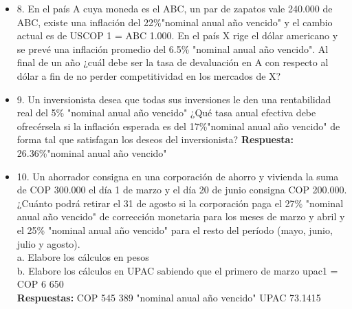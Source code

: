 \begin{itemize}
 \item 8. En el país A cuya moneda es el ABC, un par de zapatos vale 240.000 de ABC, existe una inflación  del 22\%"nominal anual año vencido" y el cambio actual es de USCOP 1 = ABC 1.000. En el país X rige el dólar americano y se prevé  una inflación promedio del 6.5\% "nominal anual año vencido". Al final de un año ¿cuál debe ser la tasa de devaluación en A con respecto al dólar a fin de no perder competitividad en los mercados de X?\\
       \medskip

 \item 9. Un inversionista desea que todas sus inversiones le den una rentabilidad real del 5\% "nominal anual año vencido" ¿Qué  tasa anual efectiva debe ofrecérsela si la inflación esperada es del 17\%"nominal anual año vencido" de forma tal que satisfagan  los deseos del inversionista?
       \textbf{Respuesta:} 26.36\%"nominal anual año vencido"\\
       \medskip

 \item 10. Un ahorrador consigna en una corporación de ahorro y vivienda la suma de COP 300.000 el día 1 de  marzo y el día 20 de junio consigna COP 200.000.  ¿Cuánto  podrá  retirar  el  31  de  agosto  si la corporación  paga el  27\% "nominal anual año vencido" de corrección monetaria para los meses de marzo y abril y el 25\% "nominal anual año vencido"  para el resto del período (mayo, junio, julio y agosto).\\
       a. Elabore los cálculos en pesos\\
       b. Elabore los cálculos en UPAC sabiendo que el primero de marzo upac1 = COP 6 650\\
       \textbf{Respuestas:} COP 545 389 "nominal anual año vencido"\hspace{0,5cm} UPAC 73.1415\\
       \medskip


\end{itemize}
